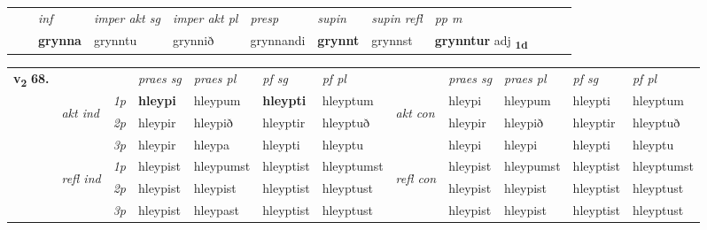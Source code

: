 \begin{tabular}{llllllllllll}
 & & \textit{inf} & \textit{imper akt sg} & \textit{imper akt pl}   & \textit{presp} & \textit{supin} & \textit{supin refl} & \textit{pp m}     \\*
  & & \textbf{grynna} & grynntu  & grynnið   & grynnandi &  \textbf{grynnt} & grynnst & \textbf{grynntur} adj \textbf{\textsubscript{1d}} \\*
\cmidrule{1-12}
\end{tabular}



\begin{tabular}{llllllllllll} \toprule
\multirow{4}{*}{{{\textbf{v{\textsubscript{2}}} \Large{\textbf{68.}}}}}  & &   &  \textit{praes sg}  & \textit{praes pl}  &\textit{ pf sg} & \textit{pf pl} &  &  \textit{praes sg}  & \textit{praes pl}  & \textit{pf sg} & \textit{pf pl } \\*
	\cmidrule{4-7} \cmidrule{9-12}
 & \multirow{3}{*}{\begin{turn}{90}\textit{akt ind}\end{turn}} & {\textit{1p}} & \textbf{hleypi} & hleypum    & \textbf{hleypti} & hleyptum & \multirow{3}{*}{\begin{turn}{90}\textit{akt con}\end{turn}} &hleypi & hleypum & hleypti & hleyptum\\*
& &  {\textit{2p}} &  hleypir  & hleypið   & hleyptir & hleyptuð & & hleypir & hleypið & hleyptir & hleyptuð \\*
& &  {\textit{3p}} & hleypir & hleypa   & hleypti & hleyptu & & hleypi & hleypi& hleypti & hleyptu  \\*
\cmidrule{4-7} \cmidrule{9-12}
 &\multirow{3}{*}{\begin{turn}{90}\textit{refl ind}\end{turn}} & {\textit{1p}} & hleypist & hleypumst    & hleyptist & hleyptumst & \multirow{3}{*}{\begin{turn}{90}\textit{refl con}\end{turn}}  &hleypist & hleypumst & hleyptist & hleyptumst\\*
 &&  {\textit{2p}} &  hleypist  & hleypist   & hleyptist & hleyptust & &hleypist & hleypist & hleyptist & hleyptust \\*
& &  {\textit{3p}} & hleypist & hleypast   & hleyptist & hleyptust & & hleypist & hleypist& hleyptist & hleyptust  \\*
\cmidrule{4-7} \cmidrule{9-12}
\end{tabular}


